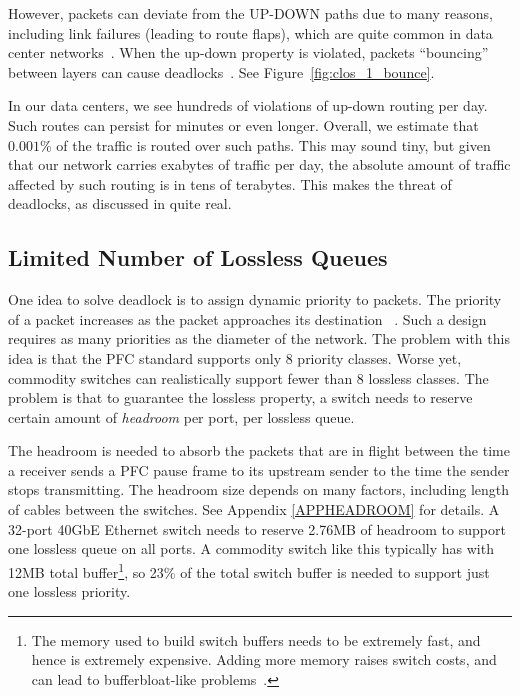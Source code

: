 However, packets can deviate from the UP-DOWN paths due to many reasons,
including link failures (leading to route flaps), which are quite common in data
center networks~\cite{netpilot,f10}. When the up-down property is violated,
packets ``bouncing'' between layers can cause
deadlocks~\cite{shpiner2016unlocking}. See
Figure~\ref{fig:clos_1_bounce}.

In our data centers, we see hundreds of violations of up-down routing per
day. Such routes can persist for minutes or even longer. Overall, we estimate
that $0.001\%$ of the traffic is routed over such paths. This may sound tiny,
but given that our network carries exabytes of traffic per day, the absolute
amount of traffic affected by such routing is in tens of terabytes. This makes
the threat of deadlocks, as discussed
in\cite{rdmaatscale,shpiner2016unlocking,hu2016deadlocks} quite real.

\subsection{Limited Number of Lossless Queues}
\label{subsec:pfcheadroom}

One idea to solve deadlock is to assign dynamic priority to packets. The
priority of a packet increases as the packet approaches its destination
~\cite{karol2003prevention}.  Such a design requires as many priorities as the
diameter of the network.  The problem with this idea is that the PFC standard
supports only 8 priority classes. Worse yet, commodity switches can
realistically support fewer than 8 lossless classes.  The problem is that  to
guarantee the lossless property, a switch needs to reserve certain amount of
{\it headroom} per port, per lossless queue.

The headroom is needed to absorb the packets that are in flight between the time
a receiver sends a PFC pause frame to its upstream sender to the time the sender
stops transmitting.  The headroom size depends on many factors, including length
of cables between the switches. See Appendix \ref{APPHEADROOM} for details.  A 32-port
40GbE Ethernet switch needs to reserve 2.76MB of headroom to support one
lossless queue on all ports. A commodity switch like this typically has with
12MB total buffer\footnote{The memory used to build switch buffers needs to be
extremely fast, and hence is extremely expensive. Adding more memory raises
switch costs, and can lead to bufferbloat-like problems~\cite{dctcp}.}, so 23\%
of the total switch buffer is needed to support just one lossless priority.

